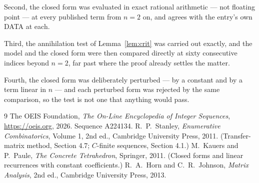 \documentclass[11pt,a4paper]{article}
\theoremstyle{plain}
\theoremstyle{definition}
\begin{document}
Second, the closed form was evaluated in exact rational arithmetic --- not floating point ---
at every published term from $n=2$ on, and agrees with the entry's own DATA at each.

Third, the annihilation test of Lemma~\ref{lem:crit} was carried out exactly, and the model
and the closed form were then compared directly at sixty consecutive indices beyond
$n=2$, far past where the proof already settles the matter.

Fourth, the closed form was deliberately perturbed --- by a constant and by a term linear in
$n$ --- and each perturbed form was rejected by the same comparison, so the test is not one
that anything would pass.

\begin{thebibliography}{9}
 The OEIS Foundation, \emph{The On-Line Encyclopedia of Integer
Sequences}, \url{https://oeis.org}, 2026. Sequence A224134.
 R.~P.~Stanley, \emph{Enumerative Combinatorics}, Volume 1, 2nd ed.,
Cambridge University Press, 2011. (Transfer-matrix method, Section 4.7; $C$-finite sequences,
Section 4.1.)
 M.~Kauers and P.~Paule, \emph{The Concrete Tetrahedron}, Springer, 2011.
(Closed forms and linear recurrences with constant coefficients.)
 R.~A.~Horn and C.~R.~Johnson, \emph{Matrix Analysis}, 2nd ed., Cambridge
University Press, 2013.
\end{thebibliography}
\end{document}
